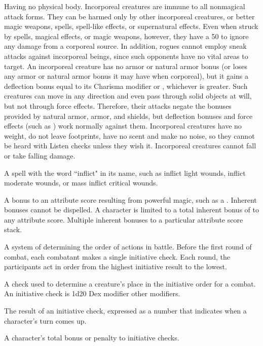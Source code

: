  Having no physical body. Incorporeal creatures are 
immune to all nonmagical attack forms. They can be harmed only by 
other incorporeal creatures,  or better magic weapons, spells, 
spell-like effects, or supernatural effects. Even when struck by spells, 
magical effects, or magic weapons, however, they have a 50%
to ignore any damage from a corporeal source. In addition, rogues 
cannot employ sneak attacks against incorporeal beings, since such 
opponents have no vital areas to target. An incorporeal creature has 
no armor or natural armor bonus (or loses any armor or natural 
armor bonus it may have when corporeal), but it gains a deflection 
bonus equal to its Charisma modifier or , whichever is greater. 
Such creatures can move in any direction and even pass through 
solid objects at will, but not through force effects. Therefore, their 
attacks negate the bonuses provided by natural armor, armor, and 
shields, but deflection bonuses and force effects (such as ) work normally against them. Incorporeal creatures have no 
weight, do not leave footprints, have no scent and make no noise, so 
they cannot be heard with Listen checks unless they wish it. 
Incorporeal creatures cannot fall or take falling damage. 

 A spell with the word ``inflict" in its name, such as 
inflict light wounds,  inflict moderate wounds, or  mass inflict critical 
wounds. 

 A bonus to an attribute score resulting from 
powerful magic, such as a  . Inherent bonuses cannot be dispelled. A character is limited to a total inherent bonus of  to any 
attribute score. Multiple inherent bonuses to a particular attribute score stack.

 A system of determining the order of actions in battle. 
Before the first round of combat, each combatant makes a single 
initiative check. Each round, the participants act in order from the 
highest initiative result to the lowest. 

 A check used to determine a creature's place in 
the initiative order for a combat. An initiative check is 1d20 \add Dex 
modifier \add other modifiers. 

 The result of an initiative check, expressed as a 
number that indicates when a character's turn comes up. 

 A character's total bonus or penalty to initiative checks. 

